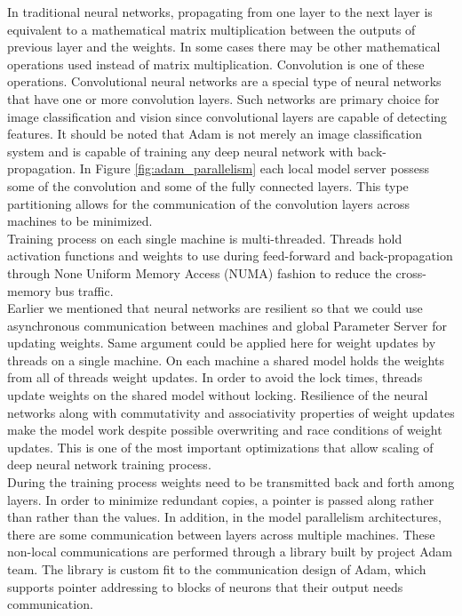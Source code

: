 \documentclass[runningheads,a4paper]{llncs}
\begin{document}
{In traditional neural networks, propagating from one layer to the next layer is equivalent to a mathematical matrix multiplication between the outputs of previous layer and the weights. In some cases there may be other mathematical operations used instead of matrix multiplication. Convolution is one of these operations. Convolutional neural networks are a special type of neural networks that have one or more convolution layers. Such networks are primary choice for image classification and vision since convolutional layers are capable of detecting features. It should be noted that Adam is not merely an image classification system and is capable of training any deep neural network with back-propagation. In Figure \ref{fig:adam_parallelism} each local model server possess some of the convolution and some of the fully connected layers. This type partitioning allows for the communication of the convolution layers across machines to be minimized.\\

Training process on each single machine is multi-threaded. Threads hold activation functions and weights to use during feed-forward and back-propagation through None Uniform Memory Access (NUMA) fashion to reduce the cross-memory bus traffic.\\

Earlier we mentioned that neural networks are resilient so that we could use asynchronous communication between machines and global Parameter Server for updating weights. Same argument could be applied here for weight updates by threads on a single machine. On each machine a shared model holds the weights from all of threads weight updates. In order to avoid the lock times, threads update weights on the shared model without locking. Resilience of the neural networks along with commutativity and associativity properties of weight updates make the model work despite possible overwriting and race conditions of weight updates. This is one of the most important optimizations that allow scaling of deep neural network training process.\\

During the training process weights need to be transmitted back and forth among layers. In order to minimize redundant copies, a pointer is passed along rather than rather than the values. In addition, in the model parallelism architectures, there are some communication between layers across multiple machines. These non-local communications are performed through a library built by project Adam team. The library is custom fit to the communication design of Adam, which supports pointer addressing to blocks of neurons that their output needs communication.\\

}
\end{document}
